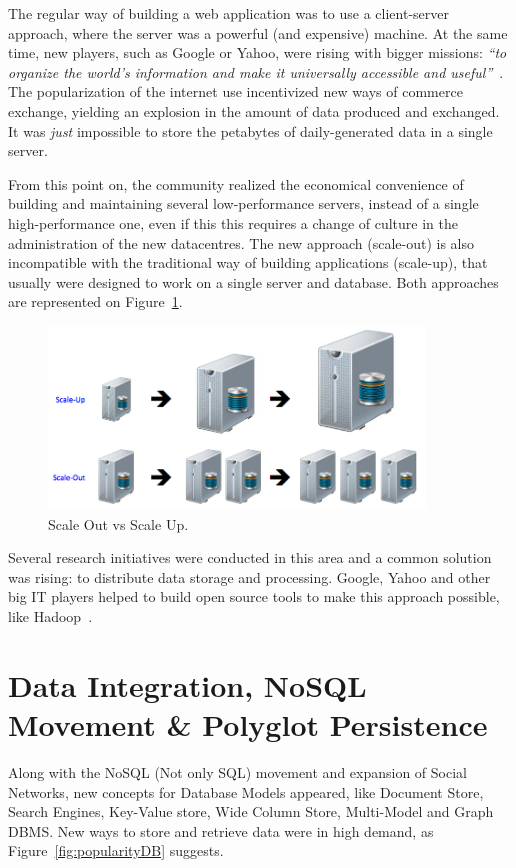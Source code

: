 The regular way of building a web application was to use a client-server approach, where the server was a powerful (and expensive) machine. 
At the same time, new players, such as Google or Yahoo, were rising with bigger missions: \textit{``to organize the world's information and make it universally accessible and useful''}~\cite{Spector:2012:GHA:2209249.2209262}. 
The popularization of the internet use incentivized new ways of commerce exchange, yielding an explosion in the amount of data produced and exchanged. 
It was \textit{just} impossible to store the petabytes of daily-generated data in a single server. 

From this point on, the community realized the economical convenience of building and maintaining several low-performance servers, instead of a single high-performance one, even if this this requires a change of culture in the administration of the new datacentres. The new approach (scale-out) is also incompatible with the traditional way of building applications (scale-up), that usually were designed to work on a single server and database. Both approaches are represented on Figure~\ref{fig:scaleupout}.

\begin{figure}[ht!]
\centering
\includegraphics[width=100mm]{scaleOut.png}
\caption{Scale Out vs Scale Up.\label{fig:scaleupout}}
\end{figure}


Several research initiatives were conducted in this area and a common solution was rising: to distribute data storage and processing. 
Google, Yahoo and other big IT players helped to build open source tools to make this approach possible, like Hadoop~\cite{5496972}.



\section{Data Integration, NoSQL Movement \& Polyglot Persistence}

Along with the NoSQL (Not only SQL) movement and expansion of Social Networks, new concepts for Database Models appeared, like Document Store, Search Engines, Key-Value store, Wide Column Store, Multi-Model and Graph DBMS. New ways to store and retrieve data were in high demand, as Figure~\ref{fig:popularityDB} suggests.

